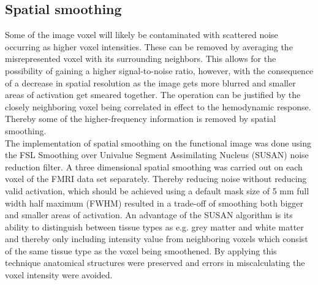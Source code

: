     
%
%

\subsection{Spatial smoothing}

Some of the image voxel will likely be contaminated with scattered noise occurring as higher voxel intensities. These can be removed by averaging the misrepresented voxel with its surrounding neighbors. This allows for the possibility of gaining a higher signal-to-noise ratio, however, with the consequence of a decrease in spatial resolution as the image gets more blurred and smaller areas of activation get smeared together. The operation can be justified by the closely neighboring voxel being correlated in effect to the hemodynamic response. Thereby some of the higher-frequency information is removed by spatial smoothing. \cite{Poldrack2011} \\
The implementation of spatial smoothing on the functional image was done using the FSL Smoothing over Univalue Segment Assimilating Nucleus (SUSAN) noise reduction filter. A three dimensional spatial smoothing was carried out on each voxel of the FMRI data set separately. Thereby reducing noise without reducing valid activation, which should be achieved using a default mask size of 5 mm full width half maximum (FWHM) resulted in a trade-off of smoothing both bigger and smaller areas of activation. An advantage of the SUSAN algorithm is its ability to distinguish between tissue types as e.g. grey matter and white matter and thereby only including intensity value from neighboring voxels which consist of the same tissue type as the voxel being smoothened. By applying this technique anatomical structures were preserved and errors in miscalculating the voxel intensity were avoided. \cite{Smith1997}  


